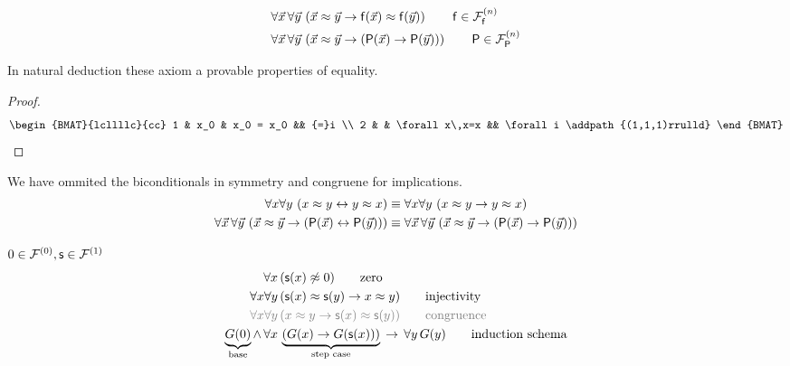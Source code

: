\begin{definition}
	\label{def:congruence:schemata}
	\begin{align*}
	\forall\vec{x}\,\forall\vec{y}\,
	&\left(\vec{x}\mEQ\vec{y} \limp \mf(\vec{x}) \mEQ \mf(\vec{y}) \right)
	\tag*{$\mf\in\mcFfn$}
	\\
	\forall\vec{x}\,\forall\vec{y}\, 
	&\left(\vec{x}\mEQ\vec{y} \limp (\mP(\vec{x}) \limp \mP(\vec{y}))\right)
	\tag*{$\mP\in\mcFPn$}
	\end{align*}
\end{definition}

\begin{lemma}In natural deduction these axiom a provable properties of equality.\end{lemma}
\begin{proof}
	\begin{gather*}
	\begin{BMAT}{lcllllc}{cc}
	1 & x_0 & x_0 = x_0      && {=}i  
	\\
	2 &     & \forall x\,x=x && \forall i
	\addpath{(1,1,1)rrulld}
	\end{BMAT}
	\end{gather*}
\end{proof}

\begin{remark}We have ommited the biconditionals in symmetry and congruene for implications.
	\begin{align*}
	\forall x \forall y\,
	\left(x \mEQ y \lbic y \mEQ x \right) 
	&
	\equiv\forall x \forall y\,
	\left(x \mEQ y \limp y \mEQ x \right)
	\\
	\forall\vec{x}\,\forall\vec{y}\, 
	\left(\vec{x}\mEQ\vec{y} \limp (\mP(\vec{x}) \lbic \mP(\vec{y}))\right)
	&\equiv
	\forall\vec{x}\,\forall\vec{y}\,
	\left(\vec{x}\mEQ\vec{y} \limp (\mP(\vec{x}) \limp \mP(\vec{y}))\right)
	\end{align*}
\end{remark}

\begin{definition}
	\label{def:natural:numbers:axioms}
	$0\in\mcFn[0], \msucc\in\mcFn[1]$	
\begin{align*}
\forall x\, &(\msucc(x) \mNE 0)
\tag*{zero} 
\\ %
\forall x \forall y\, &(\msucc(x) \mEQ \msucc(y) \limp x \mEQ y)
\tag*{injectivity}
\\
\colG\forall x\forall y\,&\colG(x\mEQ y \limp \msucc(x)\mEQ\msucc(y))
\tag*{congruence}
\\ 
\underbrace{G(0)}_{\text{base}} 
\land\, \forall x\,&
\underbrace{
	\left(G(x) \limp G(\msucc(x))\right)
}_{\text{step case}}
\,\limp\, \forall y\,G(y)
\tag*{induction schema}
\end{align*}
\end{definition}

